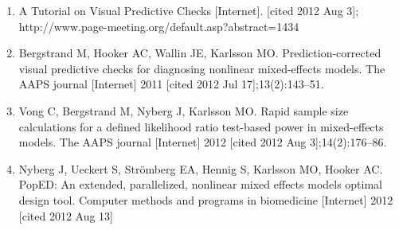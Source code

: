 \begin{enumerate}
\item A Tutorial on Visual Predictive Checks [Internet]. [cited 2012
  Aug 3]; http://www.page-meeting.org/default.asp?abstract=1434

\item Bergstrand M, Hooker AC, Wallin JE, Karlsson
  MO. Prediction-corrected visual predictive checks for diagnosing
  nonlinear mixed-effects models. The AAPS journal [Internet] 2011
  [cited 2012 Jul 17];13(2):143–51.

\item Vong C, Bergstrand M, Nyberg J, Karlsson MO. Rapid sample size
  calculations for a defined likelihood ratio test-based power in
  mixed-effects models. The AAPS journal [Internet] 2012 [cited 2012
  Aug 3];14(2):176–86.

\item Nyberg J, Ueckert S, Strömberg EA, Hennig S, Karlsson MO, Hooker
  AC. PopED: An extended, parallelized, nonlinear mixed effects models
  optimal design tool. Computer methods and programs in biomedicine
  [Internet] 2012 [cited 2012 Aug 13]
\end{enumerate}

\normalsize